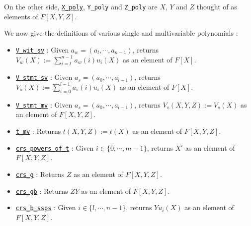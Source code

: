 \documentclass{article}
\theoremstyle{definition}
\theoremstyle{remark}
\begin{document}
On the other side, \href{https://github.com/BoltonBailey/formal-snarks-project/blob/7fd9cd122f5887f88f6a706b4f2a68a7153c7381/src/snarks/babysnark/knowledge_soundness.lean#L145}{\texttt{X\_poly}}, \texttt{Y\_poly} and 
\texttt{Z\_poly} are $X$, $Y$ and $Z$ thought of as elements of $F[X, Y, Z]$.

We now give the definitions of various single and multivariable polynomials :
\begin{itemize}
  \item \href{https://github.com/BoltonBailey/formal-snarks-project/blob/7fd9cd122f5887f88f6a706b4f2a68a7153c7381/src/snarks/babysnark/knowledge_soundness.lean#L120}{\texttt{V\_wit\_sv}} : Given $a_w = (a_l, \cdots, a_{n - 1})$, returns $V_w(X) := \sum_{i = l}^{n - 1} a_w (i) u_i (X)$ as an element of $F[X]$.
  \item \href{https://github.com/BoltonBailey/formal-snarks-project/blob/7fd9cd122f5887f88f6a706b4f2a68a7153c7381/src/snarks/babysnark/knowledge_soundness.lean#L124}{\texttt{V\_stmt\_sv}} : Given $a_s = (a_0, \cdots, a_{l - 1})$, returns $V_s(X) := \sum_{i = 0}^{l - 1} a_s (i) u_i (X)$ as an element of $F[X]$.
  \item \href{https://github.com/BoltonBailey/formal-snarks-project/blob/7fd9cd122f5887f88f6a706b4f2a68a7153c7381/src/snarks/babysnark/knowledge_soundness.lean#L153}{\texttt{V\_stmt\_mv}} : Given $a_s = (a_0, \cdots, a_{l - 1})$, returns $V_s(X, Y, Z) := V_s(X)$ as an element of $F[X, Y, Z]$.
  \item \href{https://github.com/BoltonBailey/formal-snarks-project/blob/7fd9cd122f5887f88f6a706b4f2a68a7153c7381/src/snarks/babysnark/knowledge_soundness.lean#L150}{\texttt{t\_mv}} : Returns $t(X, Y, Z) := t(X)$ as an element of $F[X, Y, Z]$.
  \item \href{https://github.com/BoltonBailey/formal-snarks-project/blob/7fd9cd122f5887f88f6a706b4f2a68a7153c7381/src/snarks/babysnark/knowledge_soundness.lean#L166}{\texttt{crs\_powers\_of\_t}} : Given $i \in \{ 0, \cdots, m - 1 \}$, returns $X^i$ as an element of $F[X, Y, Z]$.
  \item \href{https://github.com/BoltonBailey/formal-snarks-project/blob/7fd9cd122f5887f88f6a706b4f2a68a7153c7381/src/snarks/babysnark/knowledge_soundness.lean#L167}{\texttt{crs\_g}} : Returns $Z$ as an element of $F[X, Y, Z]$.
  \item \href{https://github.com/BoltonBailey/formal-snarks-project/blob/7fd9cd122f5887f88f6a706b4f2a68a7153c7381/src/snarks/babysnark/knowledge_soundness.lean#L168}{\texttt{crs\_gb}} : Returns $Z Y$ as an element of $F[X, Y, Z]$.
  \item \href{https://github.com/BoltonBailey/formal-snarks-project/blob/7fd9cd122f5887f88f6a706b4f2a68a7153c7381/src/snarks/babysnark/knowledge_soundness.lean#L169}{\texttt{crs\_b\_ssps}} : Given $i \in \{ l, \cdots, n - 1 \}$, returns $Y u_i(X)$ as an element of $F[X, Y, Z]$.
\end{itemize}
\end{document}
